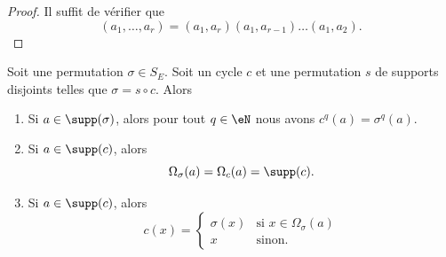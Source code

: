 \begin{proof}
	Il suffit de vérifier que
	\begin{equation}
		(a_1,\ldots, a_r)=(a_1, a_r)(a_1, a_{r-1})\ldots (a_1, a_2).
	\end{equation}
\end{proof}

\begin{lemma}        \label{LEMooGGLUooUSzuAx}
	Soit une permutation \( \sigma\in S_E\). Soit un cycle \( c\) et une permutation \( s\) de supports disjoints telles que \( \sigma=s\circ c\). Alors
	\begin{enumerate}
		\item       \label{LEMooUHWTooFptoZU}
		      Si \( a\in\supp(\sigma)\), alors pour tout \( q\in \eN\) nous avons \( c^q(a)=\sigma^q(a)\).
		\item       \label{ITEMooHSDLooIAKYZA}
		      Si \( a\in\supp(c)\), alors
		      \begin{equation}
			      \Omega_{\sigma}(a)=\Omega_c(a)=\supp(c).
		      \end{equation}
		\item
		      Si \( a\in\supp(c)\), alors
		      \begin{equation}
			      c(x)=\begin{cases}
				      \sigma(x) & \text{si } x\in\Omega_{\sigma}(a) \\
				      x         & \text{sinon. }
			      \end{cases}
		      \end{equation}
	\end{enumerate}
\end{lemma}

